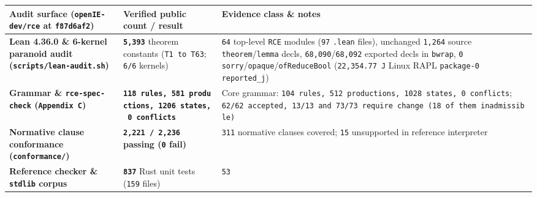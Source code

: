 \documentclass[10pt,letterpaper]{article}
\newcounter{none}
\begin{document}
{\def\LTcaptype{none} %
{\footnotesize\setlength{\tabcolsep}{3.8pt}\renewcommand{\arraystretch}{1.15}
\begin{longtable}[]{@{}
  >{\raggedright\arraybackslash}p{}
  >{\raggedright\arraybackslash}p{}
  >{\raggedright\arraybackslash}p{}@{}}
\toprule\noalign{}
\begin{minipage}[b]{\linewidth}\raggedright
\textbf{Audit surface (\texttt{openIE-dev/rce} at \texttt{f87d6af2})}
\end{minipage} & \begin{minipage}[b]{\linewidth}\raggedright
\textbf{Verified public count / result}
\end{minipage} & \begin{minipage}[b]{\linewidth}\raggedright
\textbf{Evidence class \& notes}
\end{minipage} \\
\midrule\noalign{}
\endhead
\bottomrule\noalign{}
\endlastfoot
\textbf{Lean 4.36.0 \& 6-kernel paranoid audit (\texttt{scripts/\allowbreak{}lean-\allowbreak{}audit.\allowbreak{}sh})} &
\textbf{\texttt{5,393}} theorem constants (\texttt{T1\ to\ T63}; \texttt{6/6} kernels) &
\texttt{64} top-level \texttt{RCE} modules (\texttt{97} \texttt{.lean}
files), unchanged \texttt{1,264} source \texttt{theorem}/\texttt{lemma} decls,
\texttt{68,090}/\texttt{68,092} exported decls in \texttt{bwrap}, \texttt{0} \texttt{sorry}/\texttt{opaque}/\texttt{ofReduceBool} (\texttt{22,354.77\ J} Linux RAPL \texttt{package-0} \texttt{reported\_j}) \\
\textbf{Grammar \& \texttt{rce-spec-check} (\texttt{Appendix\ C})} &
\textbf{\texttt{118\ rules,\allowbreak{}\ 581\ productions,\allowbreak{}\ 1206\ states,\allowbreak{}\ 0\ conflicts}}
& Core grammar:
\texttt{104\ rules,\allowbreak{}\ 512\ productions,\allowbreak{}\ 1028\ states,\allowbreak{}\ 0\ conflicts};
\texttt{62/\allowbreak{}62\ accepted,\allowbreak{}\ 13/\allowbreak{}13\ and\ 73/\allowbreak{}73\ require\ change\ (\allowbreak{}18\ of\ them\ inadmissible)} \\
\textbf{Normative clause conformance (\texttt{conformance/})} &
\textbf{\texttt{2,221\ /\ 2,236} passing (\texttt{0} fail)} &
\texttt{311} normative clauses covered; \texttt{15} unsupported in
reference interpreter \\
\textbf{Reference checker \& \texttt{stdlib} corpus} &
\textbf{\texttt{837}} Rust unit tests (\texttt{159} files) & \texttt{53}

\end{longtable}}}
\end{document}
